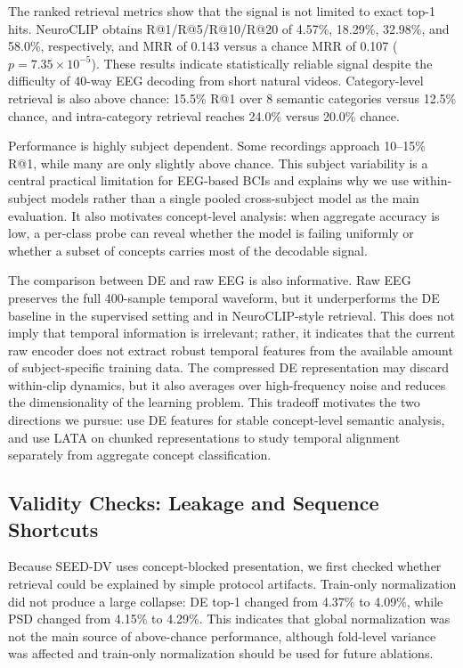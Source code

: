 \documentclass{article}
\begin{document}
The ranked retrieval metrics show that the signal is not limited to exact top-1
hits. NeuroCLIP obtains R@1/R@5/R@10/R@20 of 4.57\%, 18.29\%, 32.98\%, and
58.0\%, respectively, and MRR of 0.143 versus a chance MRR of 0.107
($p=7.35\times10^{-5}$). These results indicate statistically reliable signal
despite the difficulty of 40-way EEG decoding from short natural videos.
Category-level retrieval is
also above chance: 15.5\% R@1 over 8 semantic categories versus 12.5\% chance,
and intra-category retrieval reaches 24.0\% versus 20.0\% chance.

Performance is highly subject dependent. Some recordings approach 10--15\%
R@1, while many are only slightly above chance. This subject variability is a
central practical limitation for EEG-based BCIs and explains why we use
within-subject models rather than a single pooled cross-subject model as the main
evaluation. It also motivates concept-level analysis: when aggregate accuracy is
low, a per-class probe can reveal whether the model is failing uniformly or
whether a subset of concepts carries most of the decodable signal.

The comparison between DE and raw EEG is also informative. Raw EEG preserves
the full 400-sample temporal waveform, but it underperforms the DE baseline in
the supervised setting and in NeuroCLIP-style retrieval. This does not imply
that temporal information is irrelevant; rather, it indicates that the current
raw encoder does not extract robust temporal features from the available amount
of subject-specific training data. The compressed DE representation may discard
within-clip dynamics, but it also averages over high-frequency noise and reduces
the dimensionality of the learning problem. This tradeoff motivates the two
directions we pursue: use DE features for stable concept-level semantic analysis,
and use LATA on chunked representations to study temporal alignment separately
from aggregate concept classification.

\subsection{Validity Checks: Leakage and Sequence Shortcuts}

Because SEED-DV uses concept-blocked presentation, we first checked whether
retrieval could be explained by simple protocol artifacts. Train-only
normalization did not produce a large collapse: DE top-1 changed from 4.37\% to
4.09\%, while PSD changed from 4.15\% to 4.29\%. This indicates that global
normalization was not the main source of above-chance performance, although
fold-level variance was affected and train-only normalization should be used for
future ablations.
\end{document}
